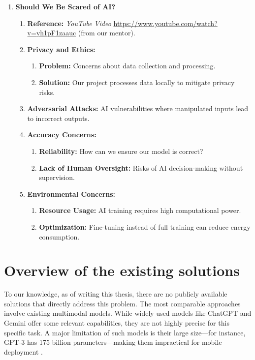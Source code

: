 \documentclass[licencjacka,en]{pracamgr}
\begin{document}
\begin{enumerate}
    \item \textbf{Should We Be Scared of AI?}
    \begin{enumerate}
        \item \textbf{Reference:} \textit{YouTube Video} \url{https://www.youtube.com/watch?v=yh1pF1zaauc} (from our mentor).
        \item \textbf{Privacy and Ethics:} 
        \begin{enumerate}
            \item \textbf{Problem:} Concerns about data collection and processing.
            \item \textbf{Solution:} Our project processes data locally to mitigate privacy risks.
        \end{enumerate}
        \item \textbf{Adversarial Attacks:} AI vulnerabilities where manipulated inputs lead to incorrect outputs.
        \item \textbf{Accuracy Concerns:} 
        \begin{enumerate}
            \item \textbf{Reliability:} How can we ensure our model is correct?
            \item \textbf{Lack of Human Oversight:} Risks of AI decision-making without supervision.
        \end{enumerate}
        \item \textbf{Environmental Concerns:} 
        \begin{enumerate}
            \item \textbf{Resource Usage:} AI training requires high computational power.
            \item \textbf{Optimization:} Fine-tuning instead of full training can reduce energy consumption.
        \end{enumerate}
    \end{enumerate}

\end{enumerate}

\chapter{Overview of the existing solutions}
To our knowledge, as of writing this thesis, there are no publicly available solutions that directly address this problem. The most comparable approaches involve existing multimodal models. While widely used models like ChatGPT and Gemini offer some relevant capabilities, they are not highly precise for this specific task. A major limitation of such models is their large size—for instance, GPT-3 has 175 billion parameters\cite{chatgpt_params}—making them impractical for mobile deployment \cite{LinguaLinked}.
\end{document}
